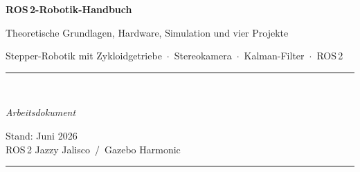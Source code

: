 
\begin{titlepage}
  \centering
  \vspace*{2cm}

  {\Huge\bfseries ROS\,2-Robotik-Handbuch\par}
  \vspace{0.5cm}
  {\Large Theoretische Grundlagen, Hardware, Simulation und vier Projekte\par}
  \vspace{0.8cm}
  {\large
    Stepper-Robotik mit Zykloidgetriebe
    \,$\cdot$\, Stereokamera
    \,$\cdot$\, Kalman-Filter
    \,$\cdot$\, ROS\,2
  \par}

  \vspace{2.5cm}
  \rule{0.6\textwidth}{0.4pt}\\[0.4cm]

  {\large\itshape Arbeitsdokument\par}
  \vspace{0.4cm}
  {\normalsize
    Stand: Juni 2026\\[4pt]
    ROS\,2 Jazzy Jalisco \,/\, Gazebo Harmonic
  \par}

  \vfill
  \rule{0.6\textwidth}{0.4pt}
\end{titlepage}
